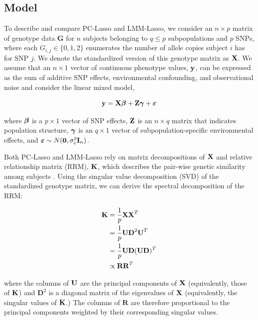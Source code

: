 \subsection{Model}

To describe and compare PC-Lasso and LMM-Lasso, we consider an $n \times p$ matrix of genotype data $\boldsymbol{G}$ for $n$ subjects belonging to $q \le p$ subpopulations and $p$ SNPs, where each $G_{i,j} \in \{ 0, 1, 2 \}$ enumerates the number of allele copies subject $i$ has for SNP $j$. We denote the standardized version of this genotype matrix as $\textbf{X}$. We assume that an $n \times 1$ vector of continuous phenotype values, $\textbf{y}$, can be expressed as the sum of additive SNP effects, environmental confounding, and observational noise and consider the linear mixed model,

\begin{equation}
    \label{eqn:model}
    \textbf{y} = \textbf{X}\boldsymbol{\beta} + \textbf{Z}\boldsymbol{\gamma} + \boldsymbol{\varepsilon}
\end{equation}

where $\boldsymbol{\beta}$ is a $p \times 1$ vector of SNP effects, $\textbf{Z}$ is an $n \times q$ matrix that indicates population structure, $\boldsymbol{\gamma}$ is an $q \times 1$ vector of subpopulation-specific environmental effects, and $\boldsymbol{\varepsilon} \sim N(\boldsymbol{0}, \sigma^2_e \textbf{I}_n)$.

Both PC-Lasso and LMM-Lasso rely on matrix decompositions of $\textbf{X}$ and relative relationship matrix (RRM), $\textbf{K}$, which describes the pair-wise genetic similarity among subjects \cite{hayes2009increased}. Using the singular value decomposition (SVD) of the standardized genotype matrix, we can derive the spectral decomposition of the RRM:

\begin{align}
    \label{eqn:k}
    \textbf{K} &= \frac{1}{p} \textbf{X} \textbf{X}^T \nonumber \\
                   &= \frac{1}{p} \textbf{U} \textbf{D}^2 \textbf{U}^T \nonumber \\
                   &= \frac{1}{p} \textbf{U} \textbf{D} (\textbf{U} \textbf{D})^T \nonumber \\
                   &\propto \textbf{R} \textbf{R}^T
\end{align}

where the columns of $\textbf{U}$ are the principal components of $\textbf{X}$ (equivalently, those of $\textbf{K}$) and $\boldsymbol{D}^2$ is a diagonal matrix of the eigenvalues of $\textbf{X}$ (equivalently, the singular values of $\textbf{K}$.) The columns of $\boldsymbol{R}$ are therefore proportional to the principal components weighted by their corresponding singular values. 

